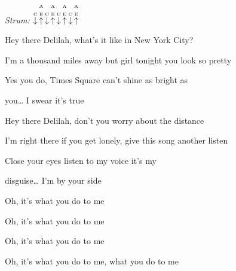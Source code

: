 \begin{song}


\begin{strumbox}
\textit{Strum:} $\PluckDown{C}\PluckUp{A \\ E}\PluckDown{C}\PluckUp{A \\ E}\PluckDown{C}\PluckUp{A \\ E}\PluckDown{C}\PluckUp{A \\ E}$
\end{strumbox}

\begin{hchordbox}
\end{hchordbox}

\large

\bigskip

\Intro {}    \par

\bigskip

 Hey there Delilah, what's it like in New York City? \par
I'm a thousand miles away but girl tonight you look so pretty \par
Yes you do,  Times Square can't shine as bright as \par
{}you… I swear it's true \par

\bigskip

 Hey there Delilah, don't you worry about the distance \par
I'm right there if you get lonely, give this song another listen \par
Close your eyes listen to my voice it's my \par
disguise… I'm by your side \par

\bigskip

\begin{chorusbox}{\Chorus}
Oh, it's what you do to me \par
{}Oh, it's what you do to me \par
{}Oh, it's what you do to me \par
{}Oh, it's what you do to me, what you  do to me \par
\end{chorusbox}


\end{song}
